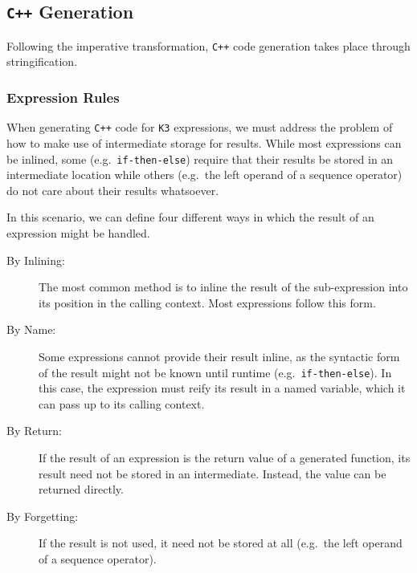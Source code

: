 \documentclass{article}
\begin{document}
    \subsection{\texttt{C++} Generation}

    Following the imperative transformation, \texttt{C++} code generation takes place through
    stringification.

    \subsubsection{Expression Rules}

    When generating \texttt{C++} code for \texttt{K3} expressions, we must address the problem of
    how to make use of intermediate storage for results. While most expressions can be inlined, some
    (e.g.~\texttt{if-then-else}) require that their results be stored in an intermediate location
    while others (e.g.~the left operand of a sequence operator) do not care about their results
    whatsoever.

    In this scenario, we can define four different ways in which the result of an expression might
    be handled.

    \begin{description}
        \item[By Inlining:] The most common method is to inline the result of the sub-expression
            into its position in the calling context. Most expressions follow this form.
        \item[By Name:] Some expressions cannot provide their result inline, as the syntactic form
            of the result might not be known until runtime (e.g.~\texttt{if-then-else}). In this
            case, the expression must reify its result in a named variable, which it can pass up to
            its calling context.
        \item[By Return:] If the result of an expression is the return value of a generated
            function, its result need not be stored in an intermediate. Instead, the value can be
            returned directly.
        \item[By Forgetting:] If the result is not used, it need not be stored at all (e.g.~the left
            operand of a sequence operator).
    \end{description}
\end{document}
